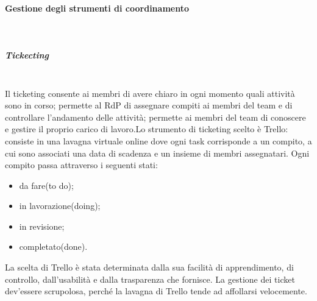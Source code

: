 			\paragraph{Gestione degli strumenti di coordinamento} \mbox{}\\
			\subparagraph{Tickecting} \mbox{}\\
			Il ticketing consente ai membri di avere chiaro in ogni momento quali attività sono in corso; permette al RdP di assegnare compiti ai membri del team e di controllare l'andamento delle attività; permette ai membri del team di conoscere e gestire il proprio carico di lavoro.\newline Lo strumento di ticketing scelto è Trello: consiste in una lavagna virtuale online dove ogni task corrisponde a un compito, a cui sono associati una data di scadenza e un insieme di membri assegnatari. Ogni compito passa attraverso i seguenti stati:
			\begin{itemize}
				\item da fare(to do);
				\item in lavorazione(doing);
				\item in revisione;
				\item completato(done).
			\end{itemize}
			La scelta di Trello è stata determinata dalla sua facilità di apprendimento, di controllo, dall'usabilità e dalla trasparenza che fornisce. La gestione dei ticket dev'essere scrupolosa, perché la lavagna di Trello tende ad affollarsi velocemente.

